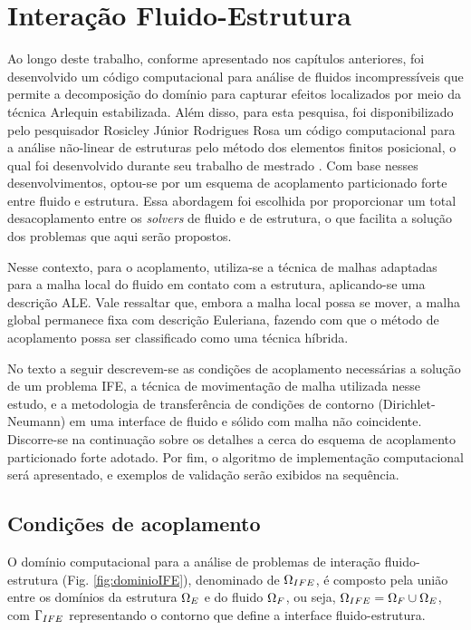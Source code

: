 \documentclass[tese_patricia]{subfiles}
\begin{document}
\chapter[Acoplamento Fluido-Estrutura]{Interação Fluido-Estrutura} \label{capitulo:Cap7}


Ao longo deste trabalho, conforme apresentado nos capítulos anteriores, foi desenvolvido um código computacional para análise de fluidos incompressíveis que permite a decomposição do domínio para capturar efeitos localizados por meio da técnica Arlequin estabilizada. Além disso, para esta pesquisa, foi disponibilizado pelo pesquisador Rosicley Júnior Rodrigues Rosa um código computacional para a análise não-linear de estruturas pelo método dos elementos finitos posicional, o qual foi desenvolvido durante seu trabalho de mestrado \cite{Rosa:2021}. Com base nesses desenvolvimentos, optou-se por um esquema de acoplamento particionado forte entre fluido e estrutura. Essa abordagem foi escolhida por proporcionar um total desacoplamento entre os \textit{solvers} de fluido e de estrutura, o que facilita a solução dos problemas que aqui serão propostos.

Nesse contexto, para o acoplamento, utiliza-se a técnica de malhas adaptadas para a malha local do fluido em contato com a estrutura, aplicando-se uma descrição ALE. Vale ressaltar que, embora a malha local possa se mover, a malha global permanece fixa com descrição Euleriana, fazendo com que o método de acoplamento possa ser classificado como uma técnica híbrida.
 
No texto a seguir descrevem-se as condições de acoplamento necessárias a solução de um problema IFE, a técnica de movimentação de malha utilizada nesse estudo, e a metodologia de transferência de condições de contorno (Dirichlet-Neumann) em uma interface de fluido e sólido com malha não coincidente. Discorre-se na continuação sobre os detalhes a cerca do esquema de acoplamento particionado forte adotado. Por fim, o algoritmo de implementação computacional será apresentado, e exemplos de validação serão exibidos na sequência.

\section{Condições de acoplamento}

O domínio computacional para a análise de problemas de interação fluido-estrutura (Fig. \ref{fig:dominioIFE}), denominado de $\Omega_{IFE}$, é composto pela união entre os domínios da estrutura $\Omega_{E}$ e do fluido $\Omega_{F}$, ou seja, $\Omega_{IFE} = \Omega_{F} \cup \Omega_{E}$, com $\Gamma_{IFE}$ representando o contorno que define a interface fluido-estrutura.
\end{document}
